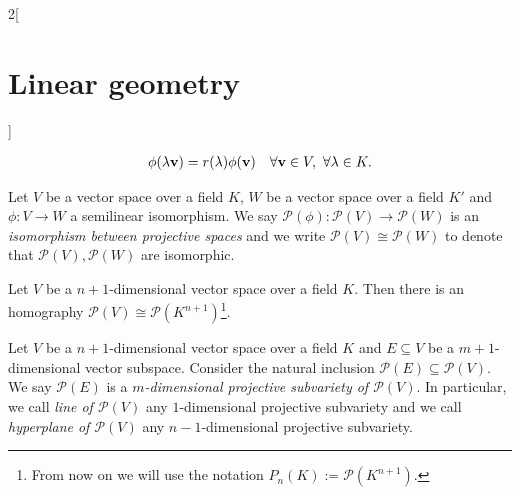 \documentclass[../../../main.tex]{subfiles}
\begin{document}
\begin{multicols}{2}[\section{Linear geometry}]
\begin{definition}
\begin{gather*}
      \phi(\lambda \boldsymbol{\mathrm{v}})=r(\lambda)\phi(\boldsymbol{\mathrm{v}})\quad \forall \boldsymbol{\mathrm{v}}\in V,\ \forall\lambda\in K.
    \end{gather*}
  \end{definition}
  \begin{definition}
    Let $V$ be a vector space over a field $K$, $W$ be a vector space over a field $K'$ and $\phi:V\rightarrow W$ a semilinear isomorphism. We say $\mathcal{P}(\phi):\mathcal{P}(V)\rightarrow\mathcal{P}(W)$ is an \textit{isomorphism between projective spaces} and we write $\mathcal{P}(V)\cong \mathcal{P}(W)$ to denote that $\mathcal{P}(V),\mathcal{P}(W)$ are isomorphic.
  \end{definition}
  \begin{prop}
    Let $V$ be a $n+1$-dimensional vector space over a field $K$. Then there is an homography $\mathcal{P}(V)\cong \mathcal{P}(K^{n+1})$\footnote{From now on we will use the notation $P_n(K):=\mathcal{P}(K^{n+1})$.}.
  \end{prop}
  \begin{definition}
    Let $V$ be a $n+1$-dimensional vector space over a field $K$ and $E\subseteq V$ be a $m+1$-dimensional vector subspace. Consider the natural inclusion $\mathcal{P}(E)\subseteq\mathcal{P}(V)$. We say $\mathcal{P}(E)$ is a \textit{$m$-dimensional projective subvariety of $\mathcal{P}(V)$}. In particular, we call \textit{line of $\mathcal{P}(V)$} any $1$-dimensional projective subvariety and we call \textit{hyperplane of $\mathcal{P}(V)$} any $n-1$-dimensional projective subvariety.
  \end{definition}

\end{multicols}
\end{document}
